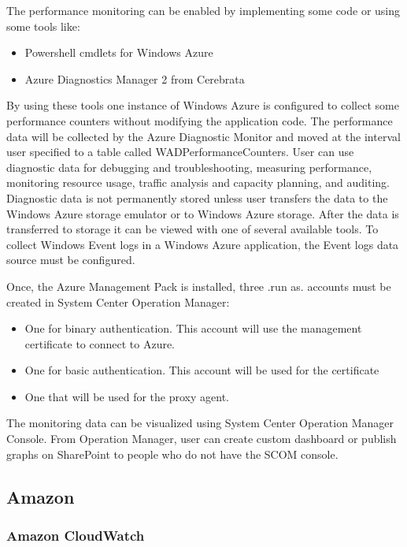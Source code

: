 \documentclass{sig-alternate}
\begin{document}
The performance monitoring can be enabled by implementing some code or using some tools like:

\begin{itemize}
  \item Powershell cmdlets for Windows Azure ~\cite{cmdlets}
  \item Azure Diagnostics Manager 2 from Cerebrata ~\cite{cerebrata}
\end{itemize}

By using these tools one instance of Windows Azure is configured to collect some performance counters without modifying the application code. The performance data will be collected by the Azure Diagnostic Monitor and moved at the interval user specified to a table called WADPerformanceCounters. User can use diagnostic data for debugging and troubleshooting, measuring performance, monitoring resource usage, traffic analysis and capacity planning, and auditing. Diagnostic data is not permanently stored unless user transfers the data to the Windows Azure storage emulator or to Windows Azure storage. After the data is transferred to storage it can be viewed with one of several available tools. To collect Windows Event logs in a Windows Azure application, the Event logs data source must be configured.

Once, the Azure Management Pack is installed, three .run as. accounts must be created in System Center Operation Manager:

\begin{itemize}
 \item One for binary authentication. This account will use the management certificate to connect to Azure.
 \item One for basic authentication. This account will be used for the certificate
 \item One that will be used for the proxy agent.
\end{itemize}
 
The monitoring data can be visualized using System Center Operation Manager Console. From Operation Manager, user can create custom dashboard or publish graphs on SharePoint to people who do not have the SCOM console.

\subsection{Amazon}

\subsubsection{Amazon CloudWatch}
\end{document}
